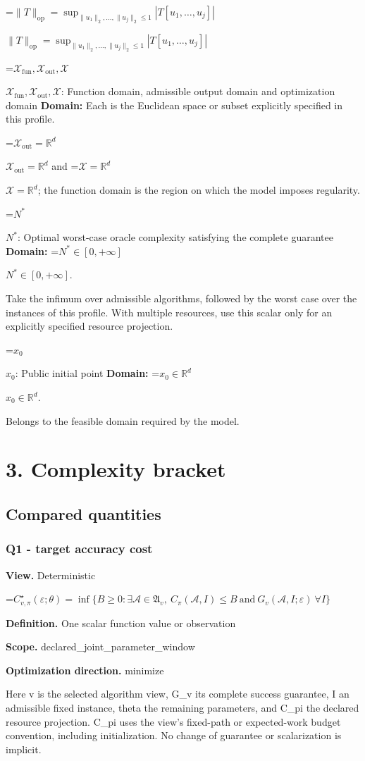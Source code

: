 \documentclass[10pt,a4paper]{article}
\newcommand{\AtlasMath}[1]{\par\begingroup\centering\setbox0=\hbox{$\displaystyle #1$}\ifdim\wd0>1.4\linewidth\typeout{ATLAS WIDE FORMULA: \the\wd0}\fi\ifdim\wd0>\linewidth\resizebox{\linewidth}{!}{\box0}\else\box0\fi\par\endgroup}
\newcommand{\AtlasInlineMath}[1]{\begingroup\setbox0=\hbox{$#1$}\ifdim\wd0>.4\linewidth\endgroup\AtlasMath{#1}\else\endgroup$#1$\fi}
\begin{document}
\AtlasInlineMath{\|T\|_{\mathrm{op}}=\sup_{\|u_1\|_2,\ldots,\|u_j\|_2\le1}|T[u_1,\ldots,u_j]|}

\AtlasInlineMath{\mathcal{X}_{\mathrm{fun}},\mathcal{X}_{\mathrm{out}},\mathcal{X}}: Function domain, admissible output domain and optimization domain \textbf{Domain:} Each is the Euclidean space or subset explicitly specified in this profile.

\AtlasInlineMath{\mathcal{X}_{\mathrm{out}}=\mathbb{R}^d} and \AtlasInlineMath{\mathcal{X}=\mathbb{R}^d}; the function domain is the region on which the model imposes regularity.

\AtlasInlineMath{N^*}: Optimal worst-case oracle complexity satisfying the complete guarantee \textbf{Domain:} \AtlasInlineMath{N^*\in[0,+\infty]}.

Take the infimum over admissible algorithms, followed by the worst case over the instances of this profile. With multiple resources, use this scalar only for an explicitly specified resource projection.

\AtlasInlineMath{x_0}: Public initial point \textbf{Domain:} \AtlasInlineMath{x_0\in\mathbb{R}^d}.

Belongs to the feasible domain required by the model.

\section{3. Complexity bracket}
\subsection{Compared quantities}
\subsubsection{Q1 - target accuracy cost}
\textbf{View.} Deterministic

\AtlasMath{C^\star_{v,\pi}(\varepsilon;\theta)=\inf\{B\ge0:\exists\mathcal A\in\mathfrak A_v,\ C_\pi(\mathcal A,I)\le B\ \text{and}\ G_v(\mathcal A,I;\varepsilon)\ \forall I\}}
\textbf{Definition.} One scalar function value or observation

\textbf{Scope.} declared\_joint\_parameter\_window

\textbf{Optimization direction.} minimize

Here v is the selected algorithm view, G\_v its complete success guarantee, I an admissible fixed instance, theta the remaining parameters, and C\_pi the declared resource projection. C\_pi uses the view's fixed-path or expected-work budget convention, including initialization. No change of guarantee or scalarization is implicit.
\end{document}
